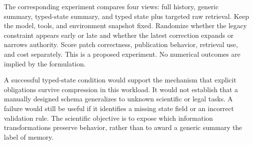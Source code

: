 The corresponding experiment compares four views: full history, generic summary, typed-state summary, and typed state plus targeted raw retrieval. Keep the model, tools, and environment snapshot fixed. Randomize whether the legacy constraint appears early or late and whether the latest correction expands or narrows authority. Score patch correctness, publication behavior, retrieval use, and cost separately. This is a proposed experiment. No numerical outcomes are implied by the formulation.

A successful typed-state condition would support the mechanism that explicit obligations survive compression in this workload. It would not establish that a manually designed schema generalizes to unknown scientific or legal tasks. A failure would still be useful if it identifies a missing state field or an incorrect validation rule. The scientific objective is to expose which information transformations preserve behavior, rather than to award a generic summary the label of memory.


